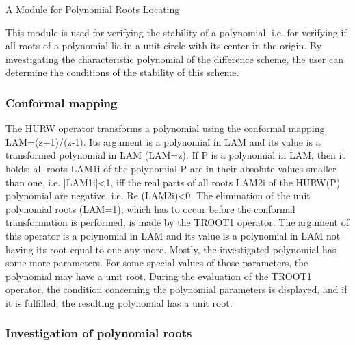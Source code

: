                 A Module for Polynomial Roots Locating



     This module is used  for verifying  the stability  of a polynomial,
i.e. for  verifying if  all roots  of a  polynomial lie in a unit circle
with its center  in  the  origin.  By  investigating  the characteristic
polynomial  of  the  difference  scheme,  the  user  can  determine  the
conditions of the stability of this scheme.


\subsubsection{Conformal mapping}


     The HURW  operator  transforms  a  polynomial  using  the conformal
mapping LAM=(z+1)/(z-1).  Its argument  is a  polynomial in  LAM and its
value is a transformed polynomial in LAM (LAM=z).  If P is  a polynomial
in LAM,  then it holds: all roots LAM1i of the polynomial P are in their
absolute values smaller than one, i.e. |LAM1i|<1, iff the real  parts of
all  roots  LAM2i  of  the  HURW(P)  polynomial  are  negative,  i.e. Re
(LAM2i)<0.
     The elimination of the unit polynomial roots (LAM=1),  which has to
occur before  the conformal  transformation is performed, is made by the
TROOT1 operator. The argument of this  operator is  a polynomial  in LAM
and its  value is  a polynomial  in LAM not having its root equal to one
any more. Mostly, the investigated polynomial has some  more parameters.
For some  special values  of those parameters, the polynomial may have a
unit root.  During the evaluation of the TROOT1 operator,  the condition
concerning  the  polynomial  parameters  is  displayed,  and  if  it  is
fulfilled, the resulting polynomial has a unit root.


\subsubsection{Investigation of polynomial roots}

